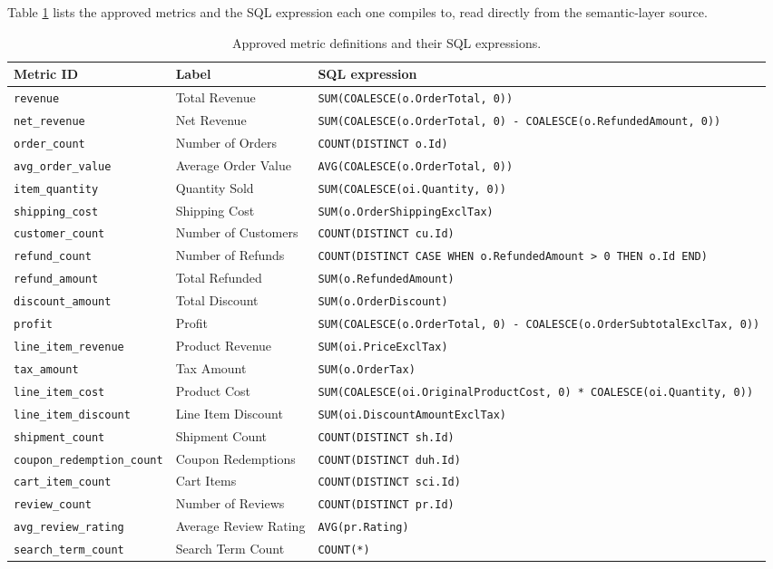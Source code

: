 \documentclass[pdflatex,sn-mathphys-num]{sn-jnl}
\begin{document}
Table \ref{tab:11} lists the approved metrics and the SQL expression each one compiles to, read directly from the semantic-layer source.


\begin{table}[t]
\caption{Approved metric definitions and their SQL expressions.}
\label{tab:11}
\centering
\renewcommand{\arraystretch}{1.15}
\begin{tabular}{p{}lp{}}
\toprule
Metric ID & Label & SQL expression \\
\midrule
\texttt{revenue} & Total Revenue & \texttt{SUM(COALESCE(o.OrderTotal, 0))} \\
\texttt{net\_revenue} & Net Revenue & \texttt{SUM(COALESCE(o.OrderTotal, 0) - COALESCE(o.RefundedAmount, 0))} \\
\texttt{order\_count} & Number of Orders & \texttt{COUNT(DISTINCT o.Id)} \\
\texttt{avg\_order\_value} & Average Order Value & \texttt{AVG(COALESCE(o.OrderTotal, 0))} \\
\texttt{item\_quantity} & Quantity Sold & \texttt{SUM(COALESCE(oi.Quantity, 0))} \\
\texttt{shipping\_cost} & Shipping Cost & \texttt{SUM(o.OrderShippingExclTax)} \\
\texttt{customer\_count} & Number of Customers & \texttt{COUNT(DISTINCT cu.Id)} \\
\texttt{refund\_count} & Number of Refunds & \texttt{COUNT(DISTINCT CASE WHEN o.RefundedAmount > 0 THEN o.Id END)} \\
\texttt{refund\_amount} & Total Refunded & \texttt{SUM(o.RefundedAmount)} \\
\texttt{discount\_amount} & Total Discount & \texttt{SUM(o.OrderDiscount)} \\
\texttt{profit} & Profit & \texttt{SUM(COALESCE(o.OrderTotal, 0) - COALESCE(o.OrderSubtotalExclTax, 0))} \\
\texttt{line\_item\_revenue} & Product Revenue & \texttt{SUM(oi.PriceExclTax)} \\
\texttt{tax\_amount} & Tax Amount & \texttt{SUM(o.OrderTax)} \\
\texttt{line\_item\_cost} & Product Cost & \texttt{SUM(COALESCE(oi.OriginalProductCost, 0) * COALESCE(oi.Quantity, 0))} \\
\texttt{line\_item\_discount} & Line Item Discount & \texttt{SUM(oi.DiscountAmountExclTax)} \\
\texttt{shipment\_count} & Shipment Count & \texttt{COUNT(DISTINCT sh.Id)} \\
\texttt{coupon\_redemption\_count} & Coupon Redemptions & \texttt{COUNT(DISTINCT duh.Id)} \\
\texttt{cart\_item\_count} & Cart Items & \texttt{COUNT(DISTINCT sci.Id)} \\
\texttt{review\_count} & Number of Reviews & \texttt{COUNT(DISTINCT pr.Id)} \\
\texttt{avg\_review\_rating} & Average Review Rating & \texttt{AVG(pr.Rating)} \\
\texttt{search\_term\_count} & Search Term Count & \texttt{COUNT(*)} \\
\bottomrule
\end{tabular}
\end{table}
\end{document}

